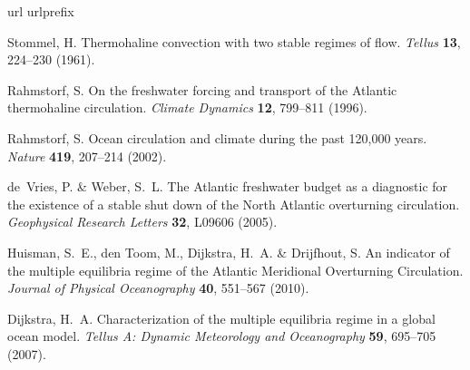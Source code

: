 \documentclass[11pt]{article}
\begin{document}

\begin{thebibliography}{10}
\expandafter\ifx\csname url\endcsname\relax
  \def\url#1{\texttt{#1}}\fi
\expandafter\ifx\csname urlprefix\endcsname\relax\def\urlprefix{URL }\fi
\providecommand{\bibinfo}[2]{#2}
\providecommand{\eprint}[2][]{\url{#2}}

\bibinfo{author}{Stommel, H.}
\newblock \bibinfo{title}{Thermohaline convection with two stable regimes of
  flow}.
\newblock \emph{\bibinfo{journal}{Tellus}} \textbf{\bibinfo{volume}{13}},
  \bibinfo{pages}{224--230} (\bibinfo{year}{1961}).

\bibinfo{author}{Rahmstorf, S.}
\newblock \bibinfo{title}{On the freshwater forcing and transport of the
  {Atlantic} thermohaline circulation}.
\newblock \emph{\bibinfo{journal}{Climate Dynamics}}
  \textbf{\bibinfo{volume}{12}}, \bibinfo{pages}{799--811}
  (\bibinfo{year}{1996}).

\bibinfo{author}{Rahmstorf, S.}
\newblock \bibinfo{title}{Ocean circulation and climate during the past 120,000
  years}.
\newblock \emph{\bibinfo{journal}{Nature}} \textbf{\bibinfo{volume}{419}},
  \bibinfo{pages}{207--214} (\bibinfo{year}{2002}).

\bibinfo{author}{de~Vries, P.} \& \bibinfo{author}{Weber, S.~L.}
\newblock \bibinfo{title}{The {Atlantic} freshwater budget as a diagnostic for
  the existence of a stable shut down of the {North Atlantic} overturning
  circulation}.
\newblock \emph{\bibinfo{journal}{Geophysical Research Letters}}
  \textbf{\bibinfo{volume}{32}}, \bibinfo{pages}{L09606}
  (\bibinfo{year}{2005}).

\bibinfo{author}{Huisman, S.~E.}, \bibinfo{author}{den Toom, M.},
  \bibinfo{author}{Dijkstra, H.~A.} \& \bibinfo{author}{Drijfhout, S.}
\newblock \bibinfo{title}{An indicator of the multiple equilibria regime of the
  {Atlantic Meridional Overturning Circulation}}.
\newblock \emph{\bibinfo{journal}{Journal of Physical Oceanography}}
  \textbf{\bibinfo{volume}{40}}, \bibinfo{pages}{551--567}
  (\bibinfo{year}{2010}).

\bibinfo{author}{Dijkstra, H.~A.}
\newblock \bibinfo{title}{Characterization of the multiple equilibria regime in
  a global ocean model}.
\newblock \emph{\bibinfo{journal}{Tellus A: Dynamic Meteorology and
  Oceanography}} \textbf{\bibinfo{volume}{59}}, \bibinfo{pages}{695--705}
  (\bibinfo{year}{2007}).


\end{thebibliography}
\end{document}
